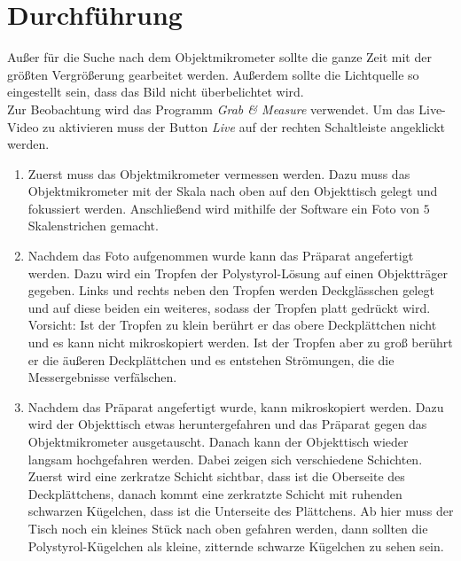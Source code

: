 \section*{Durchführung}

Außer für die Suche nach dem Objektmikrometer sollte die ganze Zeit mit der größten Vergrößerung gearbeitet werden. Außerdem sollte die Lichtquelle so eingestellt sein, dass das Bild nicht überbelichtet wird. \\
Zur Beobachtung wird das Programm \emph{Grab \& Measure} verwendet. Um das Live-Video zu aktivieren muss der Button \emph{Live} auf der rechten Schaltleiste angeklickt werden.
\begin{enumerate}

  \item Zuerst muss das Objektmikrometer vermessen werden. Dazu muss das Objektmikrometer mit der Skala nach oben auf den Objekttisch gelegt und fokussiert werden. Anschließend wird mithilfe der Software ein Foto von $5$ Skalenstrichen gemacht.

  \item Nachdem das Foto aufgenommen wurde kann das Präparat angefertigt werden. Dazu wird ein Tropfen der Polystyrol-Lösung auf einen Objektträger gegeben. Links und rechts neben den Tropfen werden Deckglässchen gelegt und auf diese beiden ein weiteres, sodass der Tropfen platt gedrückt wird. Vorsicht: Ist der Tropfen zu klein berührt er das obere Deckplättchen nicht und es kann nicht mikroskopiert werden. Ist der Tropfen aber zu groß berührt er die äußeren Deckplättchen und es entstehen Strömungen, die die Messergebnisse verfälschen.

  \item Nachdem das Präparat angefertigt wurde, kann mikroskopiert werden. Dazu wird der Objekttisch etwas heruntergefahren und das Präparat gegen das Objektmikrometer ausgetauscht. Danach kann der Objekttisch wieder langsam hochgefahren werden. Dabei zeigen sich verschiedene Schichten. Zuerst wird eine zerkratze Schicht sichtbar, dass ist die Oberseite des Deckplättchens, danach kommt eine zerkratzte Schicht mit ruhenden schwarzen Kügelchen, dass ist die Unterseite des Plättchens. Ab hier muss der Tisch noch ein kleines Stück nach oben gefahren werden, dann sollten die Polystyrol-Kügelchen als kleine, zitternde schwarze Kügelchen zu sehen sein.


\end{enumerate}

